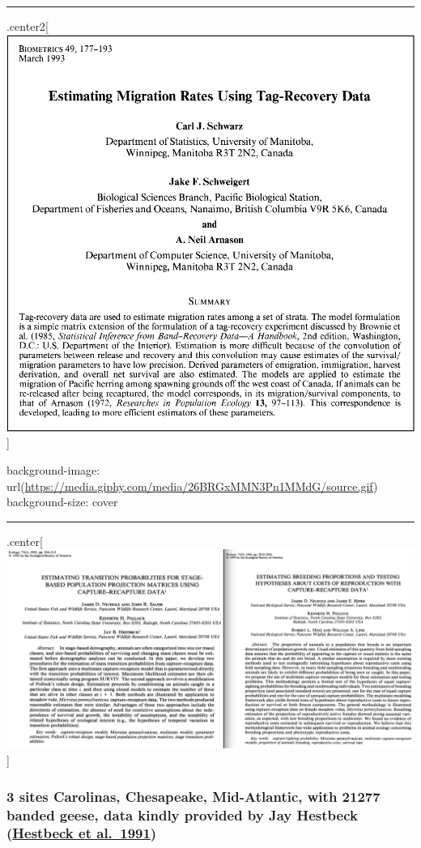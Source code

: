 \documentclass[
]{article}
\begin{document}
\begin{center}\rule{0.5\linewidth}{0.5pt}\end{center}

.center2{[} \includegraphics{img/schwarz1993.png}{]}

background-image:
url(\url{https://media.giphy.com/media/26BRGxMMN3Pn1MMdG/source.gif})
background-size: cover

\begin{center}\rule{0.5\linewidth}{0.5pt}\end{center}

.center{[} \includegraphics{img/nichols.png}{]}

\hypertarget{sites-carolinas-chesapeake-mid-atlantic-with-21277-banded-geese-data-kindly-provided-by-jay-hestbeck-hestbeck-et-al.-1991}{%
\subsubsection{\texorpdfstring{3 sites Carolinas, Chesapeake,
Mid-Atlantic, with 21277 banded geese, data kindly provided by Jay
Hestbeck
(\href{https://esajournals.onlinelibrary.wiley.com/doi/10.2307/2937193}{Hestbeck
et
al.~1991})}{3 sites Carolinas, Chesapeake, Mid-Atlantic, with 21277 banded geese, data kindly provided by Jay Hestbeck (Hestbeck et al.~1991)}}\label{sites-carolinas-chesapeake-mid-atlantic-with-21277-banded-geese-data-kindly-provided-by-jay-hestbeck-hestbeck-et-al.-1991}}
\end{document}

